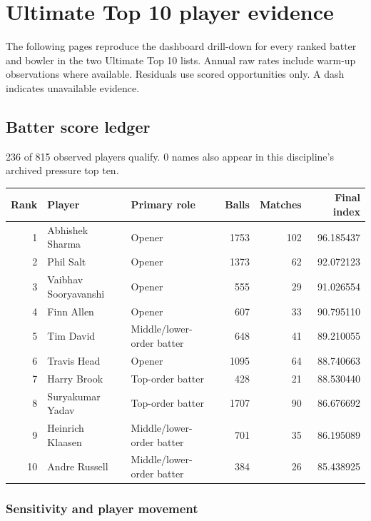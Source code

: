 \clearpage

\section{Ultimate Top 10 player evidence}

The following pages reproduce the dashboard drill-down for every ranked batter and bowler in the two Ultimate Top 10 lists. Annual raw rates include warm-up observations where available. Residuals use scored opportunities only. A dash indicates unavailable evidence.

\subsection{Batter score ledger}

236 of 815 observed players qualify. 0 names also appear in this discipline's archived pressure top ten.

\begin{center}
\begin{tabularx}{\linewidth}{r>{\raggedright\arraybackslash}X>{\raggedright\arraybackslash}Xrrr}
\toprule
Rank & Player & Primary role & Balls & Matches & Final index \\
\midrule
1 & Abhishek Sharma & Opener & 1753 & 102 & 96.185437 \\
2 & Phil Salt & Opener & 1373 & 62 & 92.072123 \\
3 & Vaibhav Sooryavanshi & Opener & 555 & 29 & 91.026554 \\
4 & Finn Allen & Opener & 607 & 33 & 90.795110 \\
5 & Tim David & Middle/lower-order batter & 648 & 41 & 89.210055 \\
6 & Travis Head & Opener & 1095 & 64 & 88.740663 \\
7 & Harry Brook & Top-order batter & 428 & 21 & 88.530440 \\
8 & Suryakumar Yadav & Top-order batter & 1707 & 90 & 86.676692 \\
9 & Heinrich Klaasen & Middle/lower-order batter & 701 & 35 & 86.195089 \\
10 & Andre Russell & Middle/lower-order batter & 384 & 26 & 85.438925 \\
\bottomrule
\end{tabularx}
\end{center}

\subsubsection*{Sensitivity and player movement}

